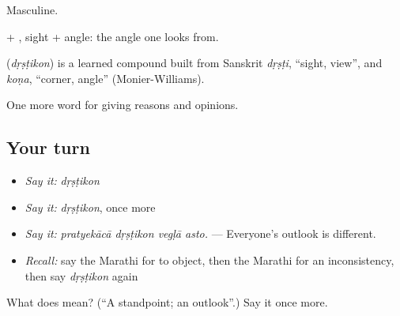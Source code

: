 Masculine.

 + , sight + angle: the angle one looks from.

\begin{cousinweb}
\textbf{} (\emph{dṛṣṭikon}) is a learned compound built from Sanskrit \emph{dṛṣṭi}, \textquotedblleft{}sight, view\textquotedblright{}, and \emph{koṇa}, \textquotedblleft{}corner, angle\textquotedblright{} (Monier-Williams).
\end{cousinweb}

\begin{grammarlens}[title={What you've built}]
One more word for giving reasons and opinions.
\end{grammarlens}

\subsection*{Your turn}
\begin{itemize}
\raggedright
  \item \emph{Say it:} \emph{dṛṣṭikon}
  \item \emph{Say it:} \emph{dṛṣṭikon}, once more
  \item \emph{Say it:} \emph{pratyekācā dṛṣṭikon vegḷā asto.} — Everyone's outlook is different.
  \item \emph{Recall:} say the Marathi for to object, then the Marathi for an inconsistency, then say \emph{dṛṣṭikon} again
\end{itemize}

\begin{tcolorbox}[breakable,colback=teal!4,colframe=teal!35!black,title={Before you move on}]
What does  mean? (\textquotedblleft{}A standpoint; an outlook\textquotedblright{}.) Say it once more.
\end{tcolorbox}
